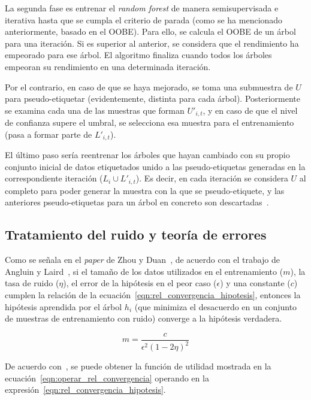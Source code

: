 \begin{itemize}
La segunda fase es entrenar el \textit{random forest} de manera semisupervisada e iterativa hasta que se cumpla el criterio de parada (como se ha mencionado anteriormente, basado en el OOBE). Para ello, se calcula el OOBE de un árbol para una iteración. Si es superior al anterior, se considera que el rendimiento ha empeorado para ese árbol. El algoritmo finaliza cuando todos los árboles empeoran su rendimiento en una determinada iteración.

Por el contrario, en caso de que se haya mejorado, se toma una submuestra de $U$ para pseudo-etiquetar (evidentemente, distinta para cada árbol). Posteriormente se examina cada una de las muestras que forman $U'_{i, t}$, y en caso de que el nivel de confianza supere el umbral, se selecciona esa muestra para el entrenamiento (pasa a formar parte de $L'_{i, t}$).

El último paso sería reentrenar los árboles que hayan cambiado con su propio conjunto inicial de datos etiquetados unido a las pseudo-etiquetas generadas en la correspondiente iteración ($L_{i}\cup L'_{i,t}$). Es decir, en cada iteración se considera $U$ al completo para poder generar la muestra con la que se pseudo-etiquete, y las anteriores pseudo-etiquetas para un árbol en concreto son descartadas~\cite{engelen2018thesis}.


\end{itemize} 

\subsection{Tratamiento del ruido y teoría de errores}

Como se señala en el \textit{paper} de Zhou y Duan~\cite{zhou2021SemisupervisedRecommendationAttack}, de acuerdo con el trabajo de Angluin y Laird~\cite{noisyExamplesCoforest1988Dana}, si el tamaño de los datos utilizados en el entrenamiento ($m$), la tasa de ruido ($\eta$), el error de la hipótesis en el peor caso ($\epsilon$) y una constante ($c$) cumplen la relación de la ecuación~\ref{eqn:rel_convergencia_hipotesis}, entonces la hipótesis aprendida por el árbol $h_{i}$ (que minimiza el desacuerdo en un conjunto de muestras de entrenamiento con ruido) converge a la hipótesis verdadera.

\begin{equation}\label{eqn:rel_convergencia_hipotesis} m = \frac{c}{\epsilon^{2}(1-2\eta)^{2}} \end{equation} 

De acuerdo con~\cite{zhou2021SemisupervisedRecommendationAttack}, se puede obtener la función de utilidad mostrada en la ecuación~\ref{eqn:operar_rel_convergencia} operando en la expresión~\ref{eqn:rel_convergencia_hipotesis}.

